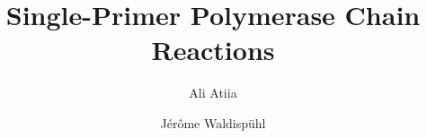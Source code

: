 
\title {\large Single-Primer Polymerase Chain Reactions }
\usepackage{authblk}
\author[1]{Ali Atiia}
\author[1]{Jérôme Waldispühl}
\renewcommand\Authfont{\fontsize{9}{14}\selectfont}
\setcounter{Maxaffil}{0}
\renewcommand\Affilfont{\fontsize{7}{14}\selectfont} %
\date{}

